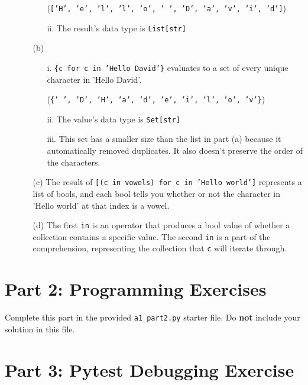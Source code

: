 \documentclass[fontsize=11pt]{article}
\begin{document}
\begin{enumerate}
\begin{enumerate}
\begin{enumerate}
                (\texttt{['H', 'e', 'l', 'l', 'o', ' ', 'D', 'a', 'v', 'i', 'd']})
                \item[ii.] The result's data type is \texttt{List[str]}
            \end{enumerate}
            \item[(b)]
            \begin{enumerate}
                \item[i.] \texttt{\{c for c in 'Hello David'\}} evaluates to a set of every unique character in 'Hello David'.

                (\texttt{\{' ', 'D', 'H', 'a', 'd', 'e', 'i', 'l', 'o', 'v'\}})
                \item[ii.] The value's data type is \texttt{Set[str]}
                \item[iii.] This set has a smaller size than the list in part (a) because it automatically removed duplicates. It also doesn't preserve the order of the characters.
            \end{enumerate}
            \item[(c)]
            The result of \texttt{[(c in vowels) for c in 'Hello world']} represents a list of bools, and each bool tells you whether or not the character in 'Hello world' at that index is a vowel.
            \item[(d)]
            The first \texttt{in} is an operator that produces a bool value of whether a collection contains a specific value. The second \texttt{in} is a part of the comprehension, representing the collection that \texttt{c} will iterate through.
        \end{enumerate}
    \end{enumerate}

    \section*{Part 2: Programming Exercises}

    Complete this part in the provided \texttt{a1\_part2.py} starter file.
    Do \textbf{not} include your solution in this file.

    \section*{Part 3: Pytest Debugging Exercise}

\end{document}
